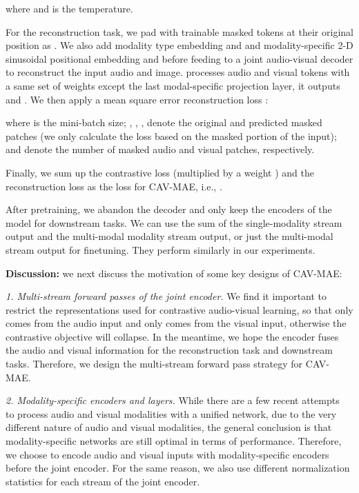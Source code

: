\documentclass{article} \usepackage{iclr2023_conference,times}
\begin{document}
where  and  is the temperature. 

For the reconstruction task, we pad  with trainable masked tokens at their original position as . We also add modality type embedding  and  and modality-specific 2-D sinusoidal positional embedding  and  before feeding  to a joint audio-visual decoder  to reconstruct the input audio and image.  processes audio and visual tokens with a same set of weights except the last modal-specific projection layer, it outputs  and . We then apply a mean square error reconstruction loss : 



where  is the mini-batch size; , , ,  denote the original and predicted masked patches (we only calculate the loss based on the masked portion of the input);  and  denote the number of masked audio and visual patches, respectively.

Finally, we sum up the contrastive loss  (multiplied by a weight ) and the reconstruction loss  as the loss for CAV-MAE, i.e., .

After pretraining, we abandon the decoder and only keep the encoders of the model for downstream tasks. We can use the sum of the single-modality stream output and the multi-modal modality stream output, or just the multi-modal stream output for finetuning. They perform similarly in our experiments.

\textbf{Discussion:} we next discuss the motivation of some key designs of CAV-MAE:

\emph{1. Multi-stream forward passes of the joint encoder.} We find it important to restrict the representations used for contrastive audio-visual learning, so that  only comes from the audio input and  only comes from the visual input, otherwise the contrastive objective will collapse. In the meantime, we hope the encoder fuses the audio and visual information for the reconstruction task and downstream tasks. Therefore, we design the multi-stream forward pass strategy for CAV-MAE.

\emph{2. Modality-specific encoders and  layers.} While there are a few recent attempts~\citep{akbari2021vatt,dai2022one} to process audio and visual modalities with a unified network, due to the very different nature of audio and visual modalities, the general conclusion is that modality-specific networks are still optimal in terms of performance. Therefore, we choose to encode audio and visual inputs with modality-specific encoders before the joint encoder.
For the same reason, we also use different normalization statistics for each stream of the joint encoder.
\end{document}
